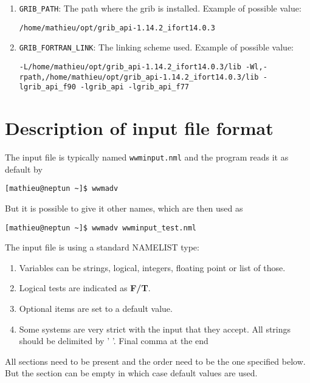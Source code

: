 \documentclass[12pt]{amsart}
\begin{document}
\begin{enumerate}
\item {\tt GRIB\_PATH}: The path where the grib is installed. Example of possible value:
\begin{verbatim}
/home/mathieu/opt/grib_api-1.14.2_ifort14.0.3
\end{verbatim}

\item {\tt GRIB\_FORTRAN\_LINK}: The linking scheme used. Example of possible value:
\begin{flushleft}
{\tt -L/home/mathieu/opt/grib\_api-1.14.2\_ifort14.0.3/lib -Wl,-rpath,/home/mathieu/opt/grib\_api-1.14.2\_ifort14.0.3/lib -lgrib\_api\_f90 -lgrib\_api -lgrib\_api\_f77}
\end{flushleft}
  



\end{enumerate}











\section{Description of input file format}
The input file is typically named {\tt wwminput.nml} and the program reads it as default by 
\begin{verbatim}
[mathieu@neptun ~]$ wwmadv
\end{verbatim}
But it is possible to give it other names, which are then used as
\begin{verbatim}
[mathieu@neptun ~]$ wwmadv wwminput_test.nml
\end{verbatim}
The input file is using a standard NAMELIST type:
\begin{enumerate}
\item Variables can be strings, logical, integers, floating point or list of those.
\item Logical tests are indicated as {\bf F/T}.
\item Optional items are set to a default value.
\item Some systems are very strict with the input that they accept. All strings should be delimited by '   '. Final comma at the end 
\end{enumerate}
All sections need to be present and the order need to be the one specified below. But the section can be empty in which case default values are used.
\end{document}
